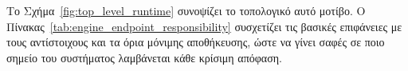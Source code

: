 Το Σχήμα~\ref{fig:top_level_runtime} συνοψίζει το τοπολογικό αυτό μοτίβο. Ο Πίνακας~\ref{tab:engine_endpoint_responsibility} συσχετίζει τις βασικές  επιφάνειες με τους αντίστοιχους  και τα όρια μόνιμης αποθήκευσης, ώστε να γίνει σαφές σε ποιο σημείο του συστήματος λαμβάνεται κάθε κρίσιμη απόφαση.



\begin{table}[H]
\centering
\caption{Κύριες  διεπαφές και αντιστοίχισή τους με τους εσωτερικούς μηχανισμούς επεξεργασίας}
\label{tab:engine_endpoint_responsibility}

\end{table}
